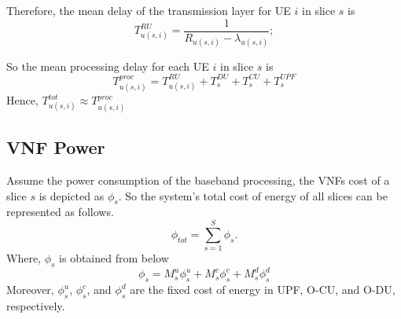 \documentclass[conference]{IEEEtran}
\begin{document}
Therefore, the mean delay of the transmission layer for UE $i$ in slice $s$ is
\begin{equation}
 T_{u(s,i)}^{RU} = \frac{1}{R_{u(s,i)} - \lambda_{u(s,i)}};
\end{equation}

So the mean processing delay for each UE $i$ in slice $s$ is 
\begin{equation}
T^{proc}_{u(s,i)} =  T^{RU}_{u(s,i)} + T^{DU}_{s} + T^{CU}_{s} + T^{UPF}_{s}
\end{equation}
Hence, $T^{tot}_{u(s,i)} \approx T^{proc}_{u(s,i)} $
\subsection{VNF Power}
Assume the power consumption of the baseband processing, the VNFs cost of a slice $s$ is depicted as
$\phi_{s}$. So the system's total cost of energy of all slices can be represented as follows.
\begin{equation*}
\textstyle \phi_{tot} = \sum_{s=1}^{S}\phi_{s}.
\end{equation*}
Where, $\phi_{s}$ is obtained from below
\begin{equation}
\phi_{s} = M_s^u \phi_s^u + M_s^c \phi_s^c+ M_s^d \phi_s^d
\end{equation}
Moreover, $\phi_s^u$, $\phi_s^c$, and $\phi_s^d$ are the fixed cost of energy in UPF, O-CU, and O-DU, respectively. 
\end{document}
